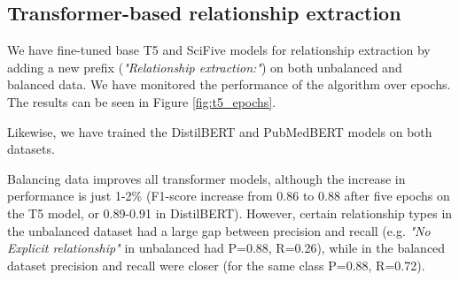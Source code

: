 \documentclass[final,12pt,3p,times,twocolumn,authoryear]{elsarticle}
\begin{document}
\subsection{Transformer-based relationship extraction}

We have fine-tuned base T5 and SciFive models for relationship extraction by adding a new prefix (\textit{"Relationship extraction:"}) on both unbalanced and balanced data. We have monitored the performance of the algorithm over epochs. The results can be seen in Figure \ref{fig:t5_epochs}.

Likewise, we have trained the DistilBERT and PubMedBERT models on both datasets.

Balancing data improves all transformer models, although the increase in performance is just 1-2\% (F1-score increase from 0.86 to 0.88 after five epochs on the T5 model, or 0.89-0.91 in DistilBERT). However, certain relationship types in the unbalanced dataset had a large gap between precision and recall (e.g. \textit{"No Explicit relationship"} in unbalanced had P=0.88, R=0.26), while in the balanced dataset precision and recall were closer (for the same class P=0.88, R=0.72).  
\end{document}
